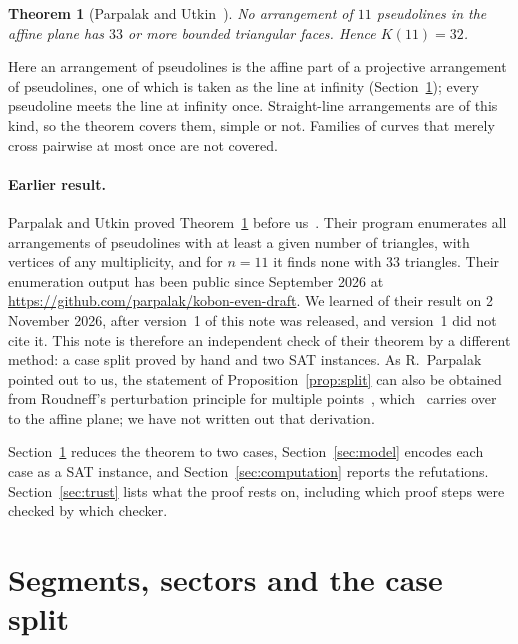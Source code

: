 \documentclass[11pt]{article}
\newtheorem{theorem}[lemma]{Theorem}
\theoremstyle{definition}
\theoremstyle{remark}
\begin{document}
\begin{theorem}[Parpalak and Utkin~{\cite[Theorem~3.12]{pu}}]\label{thm:main}
No arrangement of $11$ pseudolines in the affine plane has $33$ or more bounded triangular faces.
Hence $K(11) = 32$.
\end{theorem}

Here an arrangement of pseudolines is the affine part of a projective arrangement of pseudolines,
one of which is taken as the line at infinity (Section~\ref{sec:split}); every pseudoline meets the
line at infinity once. Straight-line arrangements are of this kind, so the theorem covers them,
simple or not. Families of curves that merely cross pairwise at most once are not covered.

\paragraph{Earlier result.} Parpalak and Utkin proved Theorem~\ref{thm:main} before
us~\cite[Theorem~3.12]{pu}. Their program enumerates all arrangements of pseudolines with at least
a given number of triangles, with vertices of any multiplicity, and for $n = 11$ it finds none with
$33$ triangles. Their enumeration output has been public since September 2026 at
\url{https://github.com/parpalak/kobon-even-draft}. We learned of their result on 2 November 2026,
after version~1 of this note was released, and version~1 did not cite it. This note is therefore
an independent check of their theorem by a different method: a case split proved by hand and two
SAT instances. As R.~Parpalak pointed out to us, the statement of
Proposition~\ref{prop:split} can also be obtained from Roudneff's perturbation principle for
multiple points~\cite{roudneff}, which~\cite[Lemma~3.9]{pu} carries over to the affine plane; we
have not written out that derivation.

Section~\ref{sec:split} reduces the theorem to two cases, Section~\ref{sec:model} encodes each
case as a SAT instance, and Section~\ref{sec:computation} reports the refutations.
Section~\ref{sec:trust} lists what the proof rests on, including which proof steps were checked by
which checker.

\section{Segments, sectors and the case split}\label{sec:split}
\end{document}

